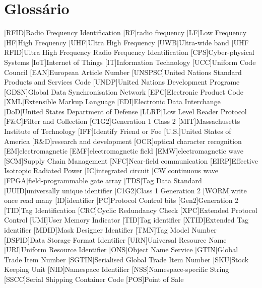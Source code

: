 \chapter{Glossário}

\footnotesize
\SingleSpacing

\begin{multicols}{2}
\begin{acronym}[AAAAAA]

	[RFID]{Radio Frequency Identification}
	[RF]{radio frequency}
	[LF]{Low Frequency}
	[HF]{High Frequency}
	[UHF]{Ultra High Frequency}
	[UWB]{Ultra-wide band}
	[UHF RFID]{Ultra High Frequency Radio Frequency Identification}
	[CPS]{Cyber-physical Systems}
	[IoT]{Internet of Things}
	[IT]{Information Technology}
	[UCC]{Uniform Code Council}
	[EAN]{European Article Number}
	[UNSPSC]{United Nations Standard Products and Services Code}
	[UNDP]{United Nations Development Programe}
	[GDSN]{Global Data Synchronisation Network}
	[EPC]{Electronic Product Code}
	[XML]{Extensible Markup Language}
	[EDI]{Electronic Data Interchange}
	[DoD]{United States Department of Defense}
	[LLRP]{Low Level Reader Protocol}
	[F\&C]{Filter and Collection}
	[C1G2]{Generation 1 Class 2}
	[MIT]{Massachusetts Institute of Technology}
	[IFF]{Identify Friend or Foe}
	[U.S.]{United States of America}
	[R\&D]{research and development}
	[OCR]{optical character recognition}
	[EM]{electromagnetic}
	[EMF]{electromagnetic field}
	[EMW]{electromagnetic wave}
	[SCM]{Supply Chain Management}
	[NFC]{Near-field communication}
	[EIRP]{Effective Isotropic Radiated Power}
	[IC]{integrated circuit}
	[CW]{continuous wave}
	[FPGA]{field-programmable gate array}
	[TDS]{Tag Data Standard}
	[UUID]{universally unique identifier}
	[C1G2]{Class 1 Generation 2}
	[WORM]{write once read many}
	[ID]{identifier}
	[PC]{Protocol Control bits}
	[Gen2]{Generation 2}
	[TID]{Tag Identification}
	[CRC]{Cyclic Redundancy Check}
	[XPC]{Extended Protocol Control}
	[UMI]{User Memory Indicator}
	[TID]{Tag identifier}
	[XTID]{Extended Tag identifier}
	[MDID]{Mask Designer Identifier}
	[TMN]{Tag Model Number}
	[DSFID]{Data Storage Format Identifier}
	[URN]{Universal Resource Name}
	[URI]{Uniform Resource Identifier}
	[ONS]{Object Name Service}
	[GTIN]{Global Trade Item Number}
	[SGTIN]{Serialised Global Trade Item Number}
	[SKU]{Stock Keeping Unit}
	[NID]{Namespace Identifier}
	[NSS]{Namespace-specific String}
	[SSCC]{Serial Shipping Container Code}
	[POS]{Point of Sale}
\end{acronym}
\end{multicols}

